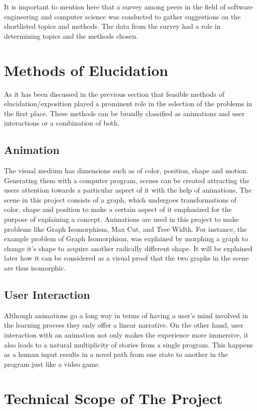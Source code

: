 It is important to mention here that a survey among
peers in the field of software engineering and computer science was conducted to 
gather suggestions on the shortlisted topics and methods.
The data from the survey had a role in determining topics and the methods chosen.


\section{Methods of Elucidation}
As it has been discussed in the previous section that feasible methods of
elucidation/exposition played a prominent role in the selection of the problems
in the first place. These methods can be broadly classified as animations and
user interactions or a combination of both.

\subsection{Animation}
The visual medium has dimensions such as of color, position, shape and motion.
Generating them with a computer program, scenes can be created attracting the
users attention towards a particular aspect of it with the help of animations.
The scene in this project consists of a graph, which undergoes transformations
of color, shape and position to make a certain aspect of it emphasized for the
purpose of explaining a concept.  Animations are used in this project to make
problems like Graph Isomorphism, Max Cut, and Tree Width. For instance, the
example problem of Graph Isomorphism, was explained by morphing a graph to change
it's shape to acquire another radically different shape. It will be explained
later how it can be considered as a visual proof that the two graphs in the
scene are thus isomorphic.

\subsection{User Interaction}
Although animations go a long way in terms of having a user's mind involved in
the learning process they only offer a linear narrative. On the other hand,
user interaction with an animation not only makes the experience more
immersive, it also leads to a natural multiplicity of stories from a single
program. This happens as a human input results in a novel path from one state to
another in the program just like a video game.

\section{Technical Scope of The Project}

